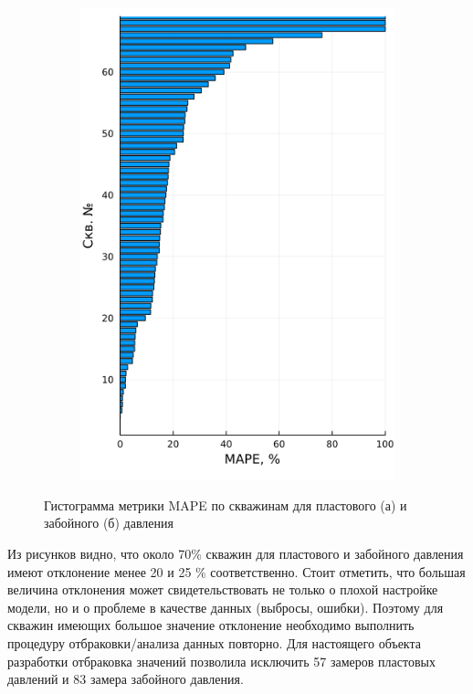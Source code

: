 \documentclass[14pt]{article}
\begin{document}
\begin{figure}[!htb]
\begin{subfigure}[b]{0.45\linewidth}
		\includegraphics[width=\linewidth]{pic/tor_gar_pw}
		\caption{}
		\label{fig:gar_tor_pw_b}
	\end{subfigure}
	\label{fig:gar_hist}
	\caption{Гистограмма метрики MAPE по скважинам для пластового (а) и забойного (б) давления}
\end{figure}
Из рисунков видно, что около 70\% скважин для пластового и забойного давления имеют отклонение менее 20 и 25 \% соответственно. Стоит отметить, что большая величина отклонения может свидетельствовать не только о плохой настройке модели, но и о проблеме в качестве данных (выбросы, ошибки). Поэтому для скважин имеющих большое значение отклонение необходимо выполнить процедуру отбраковки/анализа данных повторно. 
Для настоящего объекта разработки отбраковка значений позволила исключить 57 замеров пластовых давлений и 83 замера забойного давления.
\end{document}
